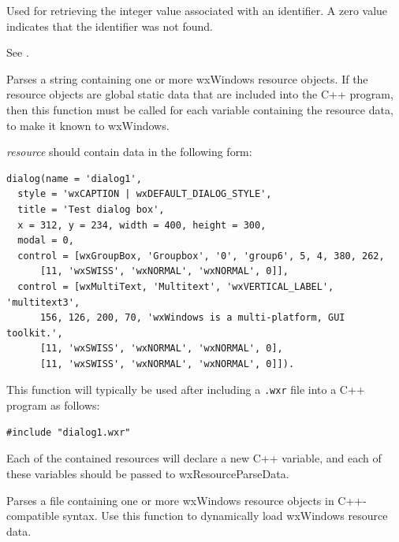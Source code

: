 Used for retrieving the integer value associated with an identifier.
A zero value indicates that the identifier was not found.

See .

\label{wxresourcedata}


Parses a string containing one or more wxWindows resource objects. If
the resource objects are global static data that are included into the
C++ program, then this function must be called for each variable
containing the resource data, to make it known to wxWindows.

{\it resource} should contain data in the following form:

\begin{verbatim}
dialog(name = 'dialog1',
  style = 'wxCAPTION | wxDEFAULT_DIALOG_STYLE',
  title = 'Test dialog box',
  x = 312, y = 234, width = 400, height = 300,
  modal = 0,
  control = [wxGroupBox, 'Groupbox', '0', 'group6', 5, 4, 380, 262,
      [11, 'wxSWISS', 'wxNORMAL', 'wxNORMAL', 0]],
  control = [wxMultiText, 'Multitext', 'wxVERTICAL_LABEL', 'multitext3',
      156, 126, 200, 70, 'wxWindows is a multi-platform, GUI toolkit.',
      [11, 'wxSWISS', 'wxNORMAL', 'wxNORMAL', 0],
      [11, 'wxSWISS', 'wxNORMAL', 'wxNORMAL', 0]]).
\end{verbatim}

This function will typically be used after including a {\tt .wxr} file into
a C++ program as follows:

\begin{verbatim}
#include "dialog1.wxr"
\end{verbatim}

Each of the contained resources will declare a new C++ variable, and each
of these variables should be passed to wxResourceParseData.



Parses a file containing one or more wxWindows resource objects
in C++-compatible syntax. Use this function to dynamically load
wxWindows resource data.

\label{wxresourceparsestring}

